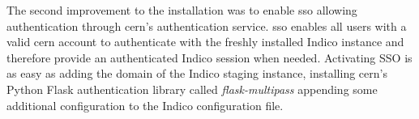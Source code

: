 The second improvement to the installation was to enable \gls{sso} allowing authentication through \gls{cern}'s authentication service. \gls{sso} enables all users with a valid \gls{cern} account to authenticate with the freshly installed Indico instance and therefore provide an authenticated Indico session when needed. Activating SSO is as easy as adding the domain of the Indico staging instance, installing \gls{cern}'s Python Flask authentication library called \textit{flask-multipass} \cite{flask-multipass} appending some additional configuration to the Indico configuration file.
